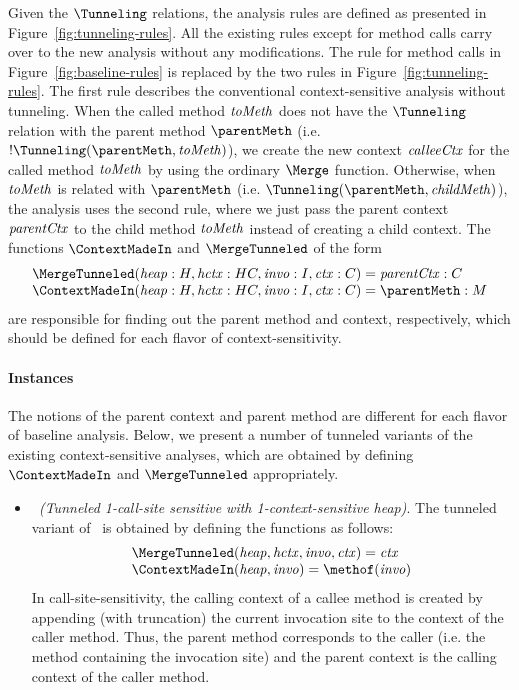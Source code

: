 {Given the $\Tunneling$ relations, the analysis rules are defined as
presented in Figure~\ref{fig:tunneling-rules}. All the existing rules
except for method calls carry over to the new analysis without any
modifications.  The rule for method calls in
Figure~\ref{fig:baseline-rules} is replaced by the two rules in
Figure~\ref{fig:tunneling-rules}.  The first rule describes the
conventional context-sensitive analysis without tunneling.  When the
called method ${\it toMeth}$ does not have the $\Tunneling$ relation
with the parent method ${\parentMeth}$ (i.e.
$!\Tunneling({\parentMeth}, {\it toMeth})$), we create the new context
${\it calleeCtx}$ for the called method ${\it toMeth}$ by using the
ordinary $\Merge$ function. Otherwise, when ${\it toMeth}$ is related
with ${\parentMeth}$ (i.e. $\Tunneling({\parentMeth}, {\it childMeth})$), the analysis uses
the second rule, where we just pass the parent context ${\it parentCtx}$
to the child method ${\it toMeth}$ instead of creating a child context. The
functions $\ContextMadeIn$ and $\MergeTunneled$ of the form
\[
  \begin{array}{l}
    \MergeTunneled ({\it heap}: H, {\it hctx}: HC, {\it invo}: I, {\it
    ctx}: C) = {\it parentCtx}: C \\
    \ContextMadeIn ({\it heap}: H, {\it hctx}: HC, {\it invo}: I, {\it
    ctx}: C) = {\parentMeth}:M
  \end{array}
\]
are responsible
for finding out the parent method and context, respectively, which
should be defined for each flavor of context-sensitivity. 

\paragraph{Instances}

The notions of the parent context and parent method are different for each
flavor of baseline analysis. Below, we present a number of
tunneled variants of the existing context-sensitive analyses, which
are obtained by
defining $\ContextMadeIn$ and $\MergeTunneled$ appropriately. 

\begin{itemize}
\item {\it \onecallHT~(Tunneled 1-call-site sensitive with
    1-context-sensitive heap)}. The tunneled variant of
  \onecallH~is obtained by defining the functions as follows: 
\[
\begin{array}{l}
\MergeTunneled ({\it heap, hctx, invo, ctx}) = {\it ctx} \\
\ContextMadeIn ({\it heap}, {\it invo}) = \methof({\it invo})
\end{array}
\]
In call-site-sensitivity, the calling context of a callee method is
created by appending (with truncation) the current invocation site to the context of the
caller method. Thus, the parent method corresponds to the caller (i.e. the method
containing the invocation site) and the parent context is the calling
context of the caller method.


\end{itemize}}
